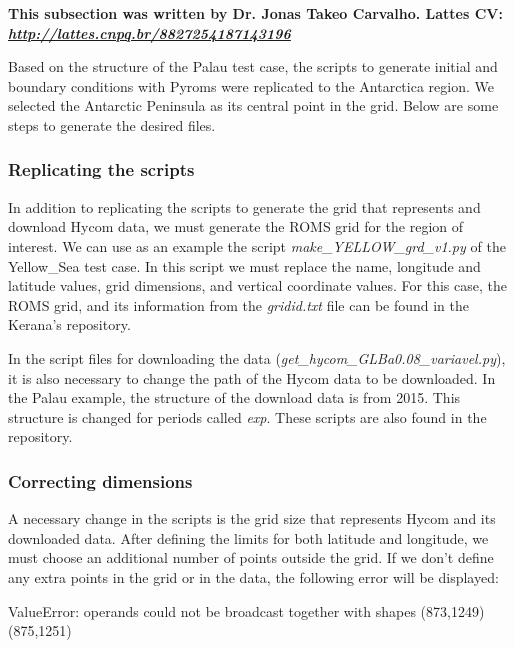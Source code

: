 \noindent \textbf{This subsection was written by Dr. Jonas Takeo Carvalho.  \newline Lattes CV: \textit{\textcolor{bleu_cite}{\href{http://lattes.cnpq.br/8827254187143196}{http://lattes.cnpq.br/8827254187143196}}}} 
\bigskip

\noindent Based on the structure of the Palau test case, the scripts to generate initial and boundary conditions with Pyroms were replicated to the Antarctica region. 
We selected the Antarctic Peninsula as its central point in the grid. Below are some steps to generate the desired files.
\bigskip

\subsubsection{Replicating the scripts}
\bigskip

\noindent In addition to replicating the scripts to generate the grid that represents and download Hycom data, we must generate the ROMS grid for the region of interest.
 We can use as an example the script \textit{make\_YELLOW\_grd\_v1.py} of the Yellow\_Sea test case. In this script we must replace the name, longitude and latitude values, 
 grid dimensions, and vertical coordinate values. For this case, the ROMS grid, and its information from the \textit{gridid.txt} file can be found in the 
 Kerana's repository. 
\bigskip

\noindent In the script files for downloading the data (\textit{get\_hycom\_GLBa0.08\_variavel.py}), it is also necessary to change the path of the Hycom data to be 
downloaded. In the Palau example, the structure of the download data is from 2015. This structure is changed for periods called \textit{exp}. These scripts are also 
found in the repository.
\bigskip

\subsubsection{Correcting dimensions}
\bigskip

\noindent A necessary change in the scripts is the grid size that represents Hycom and its downloaded data. After defining the limits for both latitude and longitude,
we must choose an additional number of points outside the grid. If we don't define any extra points in the grid or in the data, the following error will be displayed:
\bigskip

\begin{bashcode}[fontsize=\scriptsize]
ValueError: operands could not be broadcast together with shapes (873,1249) (875,1251)
\end{bashcode}
\bigskip

